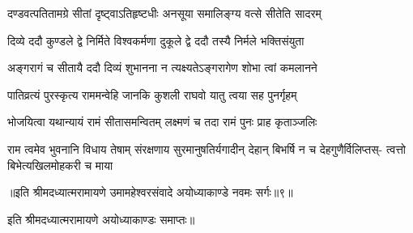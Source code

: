 \twolineshloka
{दण्डवत्पतितामग्रे सीतां दृष्ट्वाऽतिहृष्टधीः}
{अनसूया समालिङ्ग्य वत्से सीतेति सादरम्} %

\twolineshloka
{दिव्ये ददौ कुण्डले द्वे निर्मिते विश्वकर्मणा}
{दुकूले द्वे ददौ तस्यै निर्मले भक्तिसंयुता} %

\twolineshloka
{अङ्गरागं च सीतायै ददौ दिव्यं शुभानना}
{न त्यक्ष्यतेऽङ्गरागेण शोभा त्वां कमलानने} %

\twolineshloka
{पातिव्रत्यं पुरस्कृत्य राममन्वेहि जानकि}
{कुशली राघवो यातु त्वया सह पुनर्गृहम्} %

\twolineshloka
{भोजयित्वा यथान्यायं रामं सीतासमन्वितम्}
{लक्ष्मणं च तदा रामं पुनः प्राह कृताञ्जलिः} %

\fourlineindentedshloka
{राम त्वमेव भुवनानि विधाय तेषाम्}
{संरक्षणाय सुरमानुषतिर्यगादीन्}
{देहान् बिभर्षि न च देहगुणैर्विलिप्तस्-}
{त्वत्तो बिभेत्यखिलमोहकरी च माया} %

{॥इति श्रीमदध्यात्मरामायणे उमामहेश्वरसंवादे
अयोध्याकाण्डे नवमः सर्गः॥९॥
}

इति श्रीमदध्यात्मरामायणे अयोध्याकाण्डः समाप्तः॥